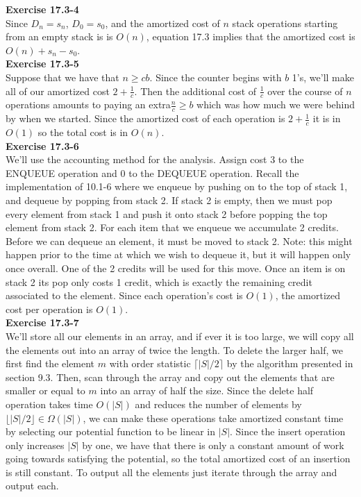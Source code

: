 \documentclass{article}
\begin{document}
\noindent\textbf{Exercise 17.3-4}\\

Since $D_n = s_n$, $D_0 = s_0$, and the amortized cost of $n$ stack operations starting from an empty stack is is $O(n)$, equation 17.3 implies that the amortized cost is $O(n) + s_n - s_0$.\\

\noindent\textbf{Exercise 17.3-5}\\

Suppose that we have that $n\ge c b$. Since the counter begins with $b$ 1's, we'll make all of our amortized cost $2+ \frac{1}{c}$. Then the additional cost of $\frac{1}{c}$ over the course of $n$ operations amounts to paying an extra$\frac{n}{c} \ge b$ which was how much we were behind by when we started. Since the amortized cost of each operation is $2+\frac{1}{c}$ it is in $O(1)$ so the total cost is in $O(n)$.\\

\noindent\textbf{Exercise 17.3-6}\\

We'll use the accounting method for the analysis.  Assign cost 3 to the ENQUEUE operation and 0 to the DEQUEUE operation.  Recall the implementation of 10.1-6 where we enqueue by pushing on to the top of stack 1, and dequeue by popping from stack 2.  If stack 2 is empty, then we must pop every element from stack 1 and push it onto stack 2 before popping the top element from stack 2.  For each item that we enqueue we accumulate 2 credits.  Before we can dequeue an element, it must be moved to stack 2.  Note: this might happen prior to the time at which we wish to dequeue it, but it will happen only once overall.  One of the 2 credits will be used for this move.  Once an item is on stack 2 its pop only costs 1 credit, which is exactly the remaining credit associated to the element.  Since each operation's cost is $O(1)$, the amortized cost per operation is $O(1)$.\\

\noindent\textbf{Exercise 17.3-7}\\

We'll store all our elements in an array, and if ever it is too large, we will copy all the elements out into an array of twice the length. To delete the larger half, we first find the element $m$ with order statistic $\lceil|S|/2\rceil$ by the algorithm presented in section 9.3. Then, scan through the array and copy out the elements that are smaller or equal to $m$ into an array of half the size. Since the delete half operation takes time $O(|S|)$ and reduces the number of elements by $\lfloor|S|/2\rfloor \in \Omega(|S|)$, we can make these operations take amortized constant time by selecting our potential function to be linear in $|S|$. Since the insert operation only increases $|S|$ by one, we have that there is only a constant amount of work going towards satisfying the potential, so the total amortized cost of an insertion is still constant. To output all the elements just iterate through the array and output each.\\
\end{document}
